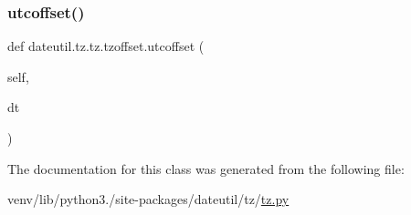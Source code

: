 \subsubsection{\texorpdfstring{utcoffset()}{utcoffset()}}
{\footnotesize\ttfamily def dateutil.\+tz.\+tz.\+tzoffset.\+utcoffset (\begin{DoxyParamCaption}\item[{}]{self,  }\item[{}]{dt }\end{DoxyParamCaption})}



The documentation for this class was generated from the following file\+:\begin{DoxyCompactItemize}
\item 
venv/lib/python3./site-\/packages/dateutil/tz/\hyperlink{tz_8py}{tz.\+py}\end{DoxyCompactItemize}
